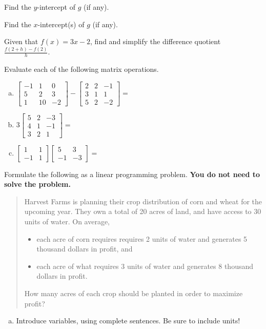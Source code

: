 \documentclass[12pt,legalpaper]{exam}
\newcommand{\MATRIX}[2]{\ensuremath{\left[\begin{array}{#1}#2\end{array}\right]}}
\newcommand{\ds}{\displaystyle}
\begin{document}
\begin{questions}
\begin{compactenum}[(a)]
\item Find the $y$-intercept of $g$ (if any).
\vspace{5cm}

\item Find the $x$-intercept(s) of $g$ (if any).
\vspace{5cm}
\end{compactenum}
\newpage

\question[3] Given that $f(x) = 3x-2$, find and simplify the difference quotient $\ds{\frac{f(2 + h) - f(2)}{h}}$.
\vspace{8cm}

\question[6] Evaluate each of the following matrix operations.
\begin{enumerate}[(a)]
\item $\MATRIX{rrr}{-1 & 1 & 0\\5 & 2 & 3\\1 & 10 & -2} - \MATRIX{rrr}{2 & 2 & -1\\3 & 1 & 1\\5 & 2 & -2} = $
\vfill

\item $3\MATRIX{rrr}{5 & 2 & -3\\4 & 1 & -1\\3 & 2 & 1} = $
\vfill

\item $\MATRIX{rr}{1 & 1\\-1 & 1}\MATRIX{rr}{5 & 3\\-1 & -3} = $
\vfill
\end{enumerate}
\newpage

\question[5] Formulate the following as a linear programming problem.  \textbf{You do not need to solve the problem.}
\begin{quote}
Harvest Farms is planning their crop distribution of corn and wheat for the upcoming year.  They own a total of 20 acres of land, and have access to 30 units of water.  On average,
\begin{itemize}
\item each acre of corn requires requires 2 units of water and generates 5 thousand dollars in profit, and
\item each acre of what requires 3 units of water and generates 8 thousand dollars in profit.
\end{itemize}
How many acres of each crop should be planted in order to maximize profit?
\end{quote}
\begin{enumerate}[(a)]
\item Introduce variables, using complete sentences.  Be sure to include units!
\vspace{4cm}


\end{enumerate}
\end{questions}
\end{document}
